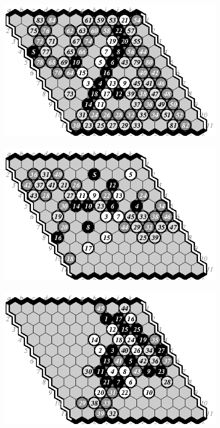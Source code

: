 \documentclass{IOS-Book-Article}
\begin{document}
\begin{figure}
\hspace*{-2cm}\
\includegraphics[scale=1]{pix/11.em1plus.eps}\hspace*{-1.5cm}\
\includegraphics[scale=1]{pix/11.me2plus.eps}\hspace*{-1.5cm}\
\includegraphics[scale=1]{pix/11.em3plus.eps}
\smallskip


\end{figure}
\end{document}
